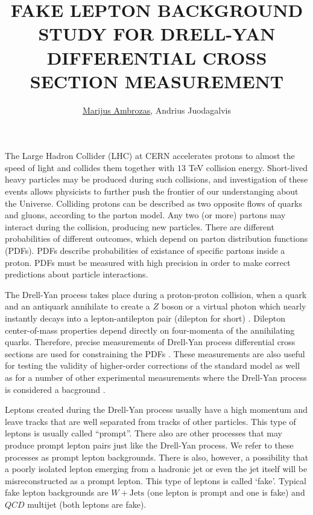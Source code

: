 \documentclass[a4paper,10pt,english]{article}
\begin{document}
\renewcommand{\figurename}{Fig.} 


\title{FAKE LEPTON BACKGROUND STUDY FOR DRELL-YAN DIFFERENTIAL CROSS SECTION MEASUREMENT}


\author{\uline{Marijus Ambrozas}, Andrius Juodagalvis}

\maketitle

\address{Institute of Theoretical Physics and Astronomy, Faculty of Physics, Vilnius University, Lithuania}


The Large Hadron Collider (LHC) at CERN accelerates protons to almost the speed of light and collides them together
with $13$ TeV collision energy.
Short-lived heavy particles may be produced during such collisions, and investigation of these events allows physicists
to further push the frontier of our understanging about the Universe.
Colliding protons can be described as two opposite flows of quarks and gluons, according to the parton model.
Any two (or more) partons may interact during the collision, producing new particles.
There are different probabilities of different outcomes, which depend on parton distribution functions (PDFs).
PDFs describe probabilities of existance of specific partons inside a proton.
PDFs must be measured with high precision in order to make correct predictions about particle interactions.

The Drell-Yan process takes place during a proton-proton collision, when a quark and an antiquark annihilate to create
a $Z$ boson or a virtual photon which nearly instantly decays into a lepton-antilepton pair (dilepton for short) \cite{DY}.
Dilepton center-of-mass properties depend directly on four-momenta of the annihilating quarks.
Therefore, precise measurements of Drell-Yan process differential cross sections are used for constraining the PDFs \cite{DY13}.
These measurements are also useful for testing the validity of higher-order corrections of the standard model as
well as for a number of other experimental measurements where the Drell-Yan process is considered a bacground \cite{Higgs, Zprime, SUSY}.

Leptons created during the Drell-Yan process usually have a high momentum and leave tracks that are well separated
from tracks of other particles.
This type of leptons is usually called ``prompt''.
There also are other processes that may produce prompt lepton pairs just like the Drell-Yan process.
We refer to these processes as prompt lepton backgrounds.
There is also, however, a possibility that a poorly isolated lepton emerging from a hadronic jet or even the jet itself
will be misreconstructed as a prompt lepton.
This type of leptons is called `fake'.
Typical fake lepton backgrounds are $W\!+\!\mathrm{Jets}$ (one lepton is prompt and one is fake) and $QC\!D$ multijet
(both leptons are fake).
\end{document}
